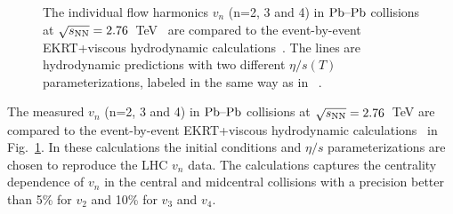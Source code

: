 \begin{figure}[h]
\begin{center}
        \caption{The individual flow harmonics $v_n$ (n=2, 3 and 4) in $\textnormal{Pb--Pb}$ collisions at $\sqrt{s_{\textnormal{NN}}}=2.76$~TeV~\cite{Adam:2016izf} are compared to the event-by-event EKRT+viscous hydrodynamic calculations~\cite{Niemi:2015qia}. The lines are hydrodynamic predictions with two different $\eta/s(T)$ parameterizations, labeled in the same way as in ~\cite{Niemi:2015qia}.}
        \label{fig:Figure_8}
              \end{center}
\end{figure}

The measured $v_n$ (n=2, 3 and 4) in $\textnormal{Pb--Pb}$ collisions at $\sqrt{s_{\textnormal{NN}}}=2.76$~TeV are compared to the event-by-event EKRT+viscous hydrodynamic calculations~\cite{Niemi:2015qia} in Fig.~\ref{fig:Figure_8}. In these calculations the initial conditions and $\eta/s$ parameterizations are chosen to reproduce the LHC $v_n$ data.
The calculations captures the centrality dependence of $v_n$ in the central and midcentral collisions with a precision better than 5\% for $v_2$ and 10\% for $v_3$ and $v_4$.

